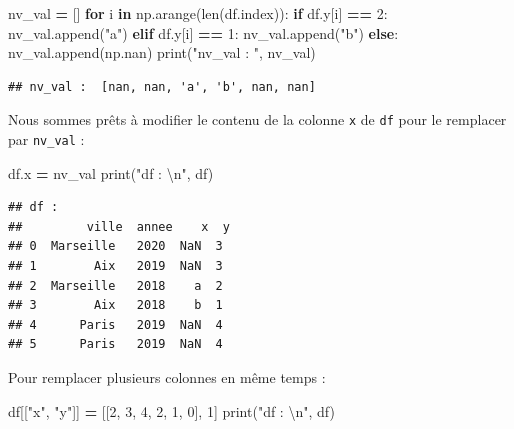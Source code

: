 \documentclass[12pt,]{book}
\newenvironment{Shaded}{\begin{snugshade}}{\end{snugshade}}
\newcommand{\KeywordTok}[1]{\textcolor[rgb]{0.13,0.29,0.53}{\textbf{#1}}}
\newcommand{\DecValTok}[1]{\textcolor[rgb]{0.00,0.00,0.81}{#1}}
\newcommand{\CharTok}[1]{\textcolor[rgb]{0.31,0.60,0.02}{#1}}
\newcommand{\StringTok}[1]{\textcolor[rgb]{0.31,0.60,0.02}{#1}}
\newcommand{\ControlFlowTok}[1]{\textcolor[rgb]{0.13,0.29,0.53}{\textbf{#1}}}
\newcommand{\OperatorTok}[1]{\textcolor[rgb]{0.81,0.36,0.00}{\textbf{#1}}}
\newcommand{\BuiltInTok}[1]{#1}
\newcommand{\NormalTok}[1]{#1}
\numberwithin{equation}{section}
\numberwithin{countremarque}{section}
\begin{document}
\begin{Shaded}
\begin{Highlighting}[]
\NormalTok{nv_val }\OperatorTok{=}\NormalTok{ []}
\ControlFlowTok{for}\NormalTok{ i }\KeywordTok{in}\NormalTok{ np.arange(}\BuiltInTok{len}\NormalTok{(df.index)):}
        \ControlFlowTok{if}\NormalTok{ df.y[i] }\OperatorTok{==} \DecValTok{2}\NormalTok{:}
\NormalTok{            nv_val.append(}\StringTok{"a"}\NormalTok{)}
        \ControlFlowTok{elif}\NormalTok{ df.y[i] }\OperatorTok{==} \DecValTok{1}\NormalTok{:}
\NormalTok{            nv_val.append(}\StringTok{"b"}\NormalTok{)}
        \ControlFlowTok{else}\NormalTok{:}
\NormalTok{            nv_val.append(np.nan)}
\BuiltInTok{print}\NormalTok{(}\StringTok{"nv_val : "}\NormalTok{, nv_val)}
\end{Highlighting}
\end{Shaded}

\begin{lstlisting}
## nv_val :  [nan, nan, 'a', 'b', nan, nan]
\end{lstlisting}

Nous sommes prêts à modifier le contenu de la colonne \texttt{x} de
\texttt{df} pour le remplacer par \texttt{nv\_val} :

\begin{Shaded}
\begin{Highlighting}[]
\NormalTok{df.x }\OperatorTok{=}\NormalTok{ nv_val}
\BuiltInTok{print}\NormalTok{(}\StringTok{"df : }\CharTok{\textbackslash{}n}\StringTok{"}\NormalTok{, df)}
\end{Highlighting}
\end{Shaded}

\begin{lstlisting}
## df : 
##         ville  annee    x  y
## 0  Marseille   2020  NaN  3
## 1        Aix   2019  NaN  3
## 2  Marseille   2018    a  2
## 3        Aix   2018    b  1
## 4      Paris   2019  NaN  4
## 5      Paris   2019  NaN  4
\end{lstlisting}

Pour remplacer plusieurs colonnes en même temps :

\begin{Shaded}
\begin{Highlighting}[]
\NormalTok{df[[}\StringTok{"x"}\NormalTok{, }\StringTok{"y"}\NormalTok{]] }\OperatorTok{=}\NormalTok{ [[}\DecValTok{2}\NormalTok{, }\DecValTok{3}\NormalTok{, }\DecValTok{4}\NormalTok{, }\DecValTok{2}\NormalTok{, }\DecValTok{1}\NormalTok{, }\DecValTok{0}\NormalTok{], }\DecValTok{1}\NormalTok{]}
\BuiltInTok{print}\NormalTok{(}\StringTok{"df : }\CharTok{\textbackslash{}n}\StringTok{"}\NormalTok{, df)}
\end{Highlighting}
\end{Shaded}
\end{document}
